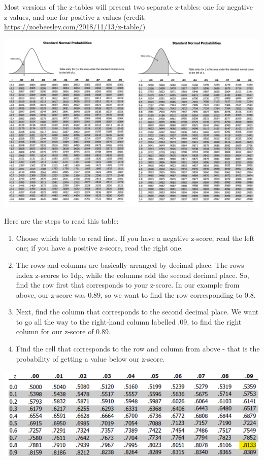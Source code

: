 \documentclass[
]{book}
\providecommand{\tightlist}{%
  \setlength{\itemsep}{0pt}\setlength{\parskip}{0pt}}
\begin{document}
Most versions of the z-tables will present two separate z-tables: one for negative z-values, and one for positive z-values (credit: \url{https://zoebeesley.com/2018/11/13/z-table/})

\includegraphics{img/z-table.webp}

Here are the steps to read this table:

\begin{enumerate}
\def\labelenumi{\arabic{enumi}.}
\tightlist
\item
  Choose which table to read first. If you have a negative z-score, read the left one; if you have a positive z-score, read the right one.
\item
  The rows and columns are basically arranged by decimal place. The rows index z-scores to 1dp, while the columns add the second decimal place. So, find the row first that corresponds to your z-score. In our example from above, our z-score was 0.89, so we want to find the row corresponding to 0.8.
\item
  Next, find the column that corresponds to the second decimal place. We want to go all the way to the right-hand column labelled .09, to find the right column for our z-score of 0.89.
\item
  Find the cell that corresponds to the row and column from above - that is the probability of getting a value below our z-score.
\end{enumerate}

\begin{center}\includegraphics[width=13.04in]{img/ztable_highlight} \end{center}
\end{document}
